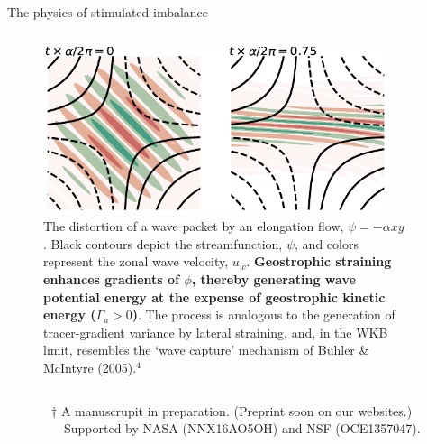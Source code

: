 \documentclass[final]{beamer}
\begin{document}
\begin{frame}[t]
\begin{columns}[t]
\begin{column}{0.425\paperwidth}
{\begin{alertblock}{The physics of stimulated imbalance}
\begin{columns}
                \begin{column}{0.535\textwidth}
                  \vskip1.75cm
                  \begin{figure}
                    \includegraphics[width=0.95\textwidth]{figs/Gamma_a.pdf}
                    \caption{The distortion of a wave packet by an elongation flow,
                    $\psi = -\alpha xy$.
                    Black contours depict the
                    streamfunction, $\psi$, and colors represent the zonal wave velocity,
                    $u_w$.
                              \textbf{Geostrophic straining enhances gradients of $\phi$,
                              thereby generating wave potential energy at the expense
                              of geostrophic kinetic energy ($\Gamma_a>0$)}. The
                              process is analogous to the generation of tracer-gradient
                              variance by lateral straining, and, in the WKB limit,
                              resembles the `wave capture' mechanism of
                              B{\"u}hler \& McIntyre (2005).$^4$}
                  \end{figure}
                \end{column}

                \end{columns}
      \end{alertblock}
      }
      \vskip0.5cm
      ~~~~~~~$\dagger$ A manuscrupit in preparation. (Preprint soon on our websites.)\\
      ~~~~~~~~~Supported by NASA (NNX16AO5OH) and NSF (OCE1357047).
    \end{column}


    \hspace{1.cm}

    \begin{column}{0.55\textwidth}


\end{column}
\end{columns}
\end{frame}
\end{document}
